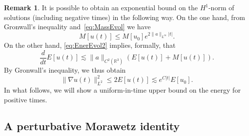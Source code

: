 \documentclass[10pt]{amsart}
\theoremstyle{definition}\newtheorem{defi}[theo]{Definition}\newtheorem{rema}[theo]{Remark}\newtheorem{exam}[theo]{Example}\newtheorem{exem}[theo]{Example}\newtheorem{nota}[theo]{Notation}
\newcommand*\R{\mathbb{R}}
\begin{document}
\begin{rema}\label{prpBackWP}
It is possible to obtain an exponential bound on the $H^1$-norm of solutions (including negative times) in the following way. On the one hand, from Gronwall's inequality and~\eqref{eq:MassEvol} we have
\begin{equation*}
M[u(t)] \leq M[u_0] e^{2\| a \|_{L^{\infty}} |t|}.
\end{equation*}
On the other hand, \eqref{eq:EnerEvol2} implies, formally, that
\[
\frac{d}{dt} E[u(t)]
\lesssim \| a \|_{C^2(\R^3)} \left(E[u(t)] + M[u(t)] \right).
\]
By Gronwall's inequality, we thus obtain
\begin{equation*}
\| \nabla u(t) \|_{L^2}^2 \leq 2 E[u(t)] \lesssim e^{C|t|} E[u_0].
\end{equation*}
In what follows, we will show a uniform-in-time upper bound on the energy for positive times.
\end{rema}

\subsection{A perturbative Morawetz identity} \label{ss:mor}
\end{document}
